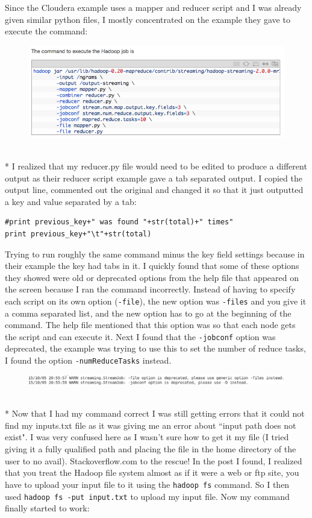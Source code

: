 \documentclass[10pt]{article}
\begin{document}
Since the Cloudera example uses a mapper and reducer script and I was already given similar python files, I mostly concentrated on the example they gave to execute the command:\pagebreak
\begin{figure}[!h]
\includegraphics[scale=0.5]{week7_hadoop_example_command.png}
\centering
\end{figure}\\*
I realized that my reducer.py file would need to be edited to produce a different output as their reducer script example gave a tab separated output. I copied the output line, commented out the original and changed it so that it just outputted a key and value separated by a tab: 
\begin{verbatim}
#print previous_key+" was found "+str(total)+" times" 
print previous_key+"\t"+str(total) 
\end{verbatim}
Trying to run roughly the same command minus the key field settings because in their example the key had tabs in it. I quickly found that some of these options they showed were old or deprecated options from the help file that appeared on the screen because I ran the command incorrectly. Instead of having to specify each script on its own option (\verb|-file|), the new option was \verb|-files| and you give it a comma separated list, and the new option has to go at the beginning of the command. The help file mentioned that this option was so that each node gets the script and can execute it. Next I found that the \verb|-jobconf| option was deprecated, the example was trying to use this to set the number of reduce tasks, I found the option \verb|-numReduceTasks| instead. 
\begin{figure}[!h]
\includegraphics[scale=0.55]{failed_streaming.png}
\centering
\end{figure}\\*
Now that I had my command correct I was still getting errors that it could not find my inputs.txt file as it was giving me an error about “input path does not exist". I was very confused here as I wasn’t sure how to get it my file (I tried giving it a fully qualified path and placing the file in the home directory of the user to no avail). Stackoverflow.com to the rescue! In the post I found, I realized that you treat the Hadoop file system almost as if it were a web or ftp site, you have to upload your input file to it using the \verb|hadoop fs| command. So I then used \verb|hadoop fs -put input.txt| to upload my input file. Now my command finally started to work:\pagebreak
\end{document}
